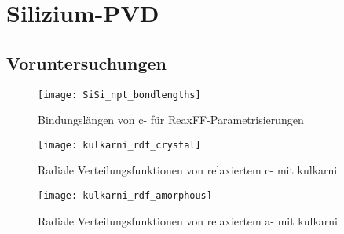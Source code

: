 \chapter{Silizium-PVD}
\label{appendix:silicon}

\section{Voruntersuchungen}

\begin{figure}[h!]
  \centering
  \texttt{[image: SiSi\_npt\_bondlengths]}
  \caption{Bindungslängen von c- für ReaxFF-Parametrisierungen}
  \label{fig:sisibondlengths}
\end{figure}

\begin{figure}[h!]
  \centering
  \texttt{[image: kulkarni\_rdf\_crystal]}
  \caption[Radiale Verteilungsfunktionen von relaxiertem c-]{
    Radiale Verteilungsfunktionen von relaxiertem c- mit kulkarni
  }
  \label{fig:kulkarnirdf}
\end{figure}

\begin{figure}[h!]
  \centering
  \texttt{[image: kulkarni\_rdf\_amorphous]}
  \caption[Radiale Verteilungsfunktionen von relaxiertem a-]{
    Radiale Verteilungsfunktionen von relaxiertem a- mit kulkarni
    }
  \label{fig:amorphousrdf}
\end{figure}

